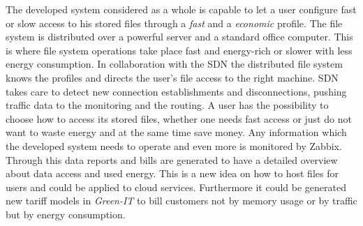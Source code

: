 \label{sec:conclusion}
The developed system considered as a whole is capable to let a user configure fast or slow access to his stored files through a \textit{fast} and a \textit{economic} profile. The file system is distributed over a powerful server and a standard office computer. This is where file system operations take place fast and energy-rich or slower with less energy consumption. In collaboration with the SDN the distributed file system knows the profiles and directs the user's file access to the right machine. SDN takes care to detect new connection establishments and disconnections, pushing traffic data to the monitoring and the routing. A user has the possibility to choose how to access its stored files, whether one needs fast access or just do not want to waste energy and at the same time save money. Any information which the developed system needs to operate and even more is monitored by Zabbix. Through this data reports and bills are generated to have a detailed overview about data access and used energy. This is a new idea on how to host files for users and could be applied to cloud services. Furthermore it could be generated new tariff models in \textit{Green-IT} to bill customers not by memory usage or by traffic but by energy consumption.